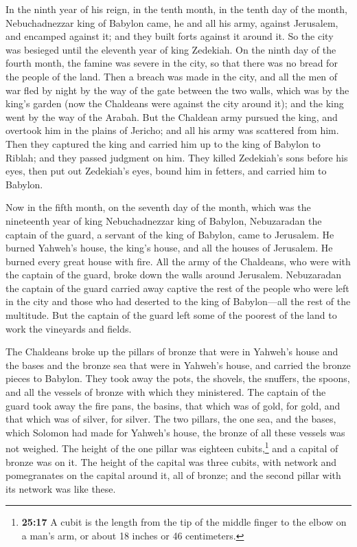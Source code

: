  In the ninth year of his reign, in the tenth month, in
the tenth day of the month, Nebuchadnezzar king of Babylon came, he and
all his army, against Jerusalem, and encamped against it; and they built
forts against it around it.  So the city was besieged
until the eleventh year of king Zedekiah.  On the ninth
day of the fourth month, the famine was severe in the city, so that
there was no bread for the people of the land.  Then a
breach was made in the city, and all the men of war fled by night by the
way of the gate between the two walls, which was by the king's garden
(now the Chaldeans were against the city around it); and the king went
by the way of the Arabah.  But the Chaldean army pursued
the king, and overtook him in the plains of Jericho; and all his army
was scattered from him.  Then they captured the king and
carried him up to the king of Babylon to Riblah; and they passed
judgment on him.  They killed Zedekiah's sons before his
eyes, then put out Zedekiah's eyes, bound him in fetters, and carried
him to Babylon.

 Now in the fifth month, on the seventh day of the month,
which was the nineteenth year of king Nebuchadnezzar king of Babylon,
Nebuzaradan the captain of the guard, a servant of the king of Babylon,
came to Jerusalem.  He burned Yahweh's house, the king's
house, and all the houses of Jerusalem. He burned every great house with
fire.  All the army of the Chaldeans, who were with the
captain of the guard, broke down the walls around Jerusalem.
 Nebuzaradan the captain of the guard carried away
captive the rest of the people who were left in the city and those who
had deserted to the king of Babylon---all the rest of the multitude.
 But the captain of the guard left some of the poorest of
the land to work the vineyards and fields.

 The Chaldeans broke up the pillars of bronze that were
in Yahweh's house and the bases and the bronze sea that were in Yahweh's
house, and carried the bronze pieces to Babylon.  They
took away the pots, the shovels, the snuffers, the spoons, and all the
vessels of bronze with which they ministered.  The
captain of the guard took away the fire pans, the basins, that which was
of gold, for gold, and that which was of silver, for silver.
 The two pillars, the one sea, and the bases, which
Solomon had made for Yahweh's house, the bronze of all these vessels was
not weighed.  The height of the one pillar was eighteen
cubits,\footnote{\textbf{25:17} A cubit is the length from the tip of
  the middle finger to the elbow on a man's arm, or about 18 inches or
  46 centimeters.} and a capital of bronze was on it. The height of the
capital was three cubits, with network and pomegranates on the capital
around it, all of bronze; and the second pillar with its network was
like these.


